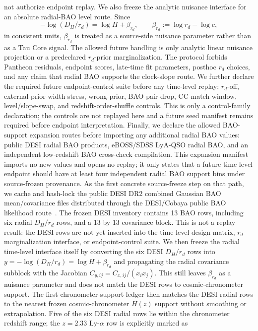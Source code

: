 \documentclass[11pt]{article}
\begin{document}
not authorize endpoint replay.
We also freeze the analytic nuisance interface for an absolute radial-BAO
level route.  Since
\[
  -\log(D_H/r_d)=\log H+\beta_{r_d},\qquad
  \beta_{r_d}:=\log r_d-\log c ,
\]
in consistent units, \(\beta_{r_d}\) is treated as a source-side nuisance
parameter rather than as a Tau Core signal.  The allowed future handling is
only analytic linear nuisance projection or a predeclared \(r_d\)-prior
marginalization.  The protocol forbids Pantheon residuals, endpoint scores,
late-time fit parameters, posthoc \(r_d\) choices, and any claim that radial
BAO supports the clock-slope route.
We further declare the required future endpoint-control suite before any
time-level replay: \(r_d\)-off, external-prior-width stress, wrong-prior,
BAO-pair-drop, CC-match-window, level/slope-swap, and redshift-order-shuffle
controls.  This is only a control-family declaration; the controls are not
replayed here and a future seed manifest remains required before endpoint
interpretation.
Finally, we declare the allowed BAO-support expansion routes before importing
any additional radial BAO values: public DESI radial BAO products,
eBOSS/SDSS LyA-QSO radial BAO, and an independent low-redshift BAO
cross-check compilation.  This expansion manifest imports no new values and
opens no replay; it only states that a future time-level endpoint should have
at least four independent radial BAO support bins under source-frozen
provenance.
As the first concrete source-freeze step on that path, we cache and hash-lock
the public DESI DR2 combined Gaussian BAO mean/covariance files distributed
through the DESI/Cobaya public BAO likelihood
route~\cite{DESIDR2BAO2025,DESIDR2Products2025}.  The frozen DESI inventory
contains 13 BAO rows, including six radial \(D_H/r_d\) rows, and a 13 by 13
covariance block.  This is not a replay result: the DESI rows are not yet
inserted into the time-level design matrix, \(r_d\)-marginalization interface,
or endpoint-control suite.
We then freeze the radial time-level interface itself by converting the six
DESI \(D_H/r_d\) rows into \(y=-\log(D_H/r_d)=\log H+\beta_{r_d}\) and
propagating the radial covariance subblock with the Jacobian
\(C_{y,ij}=C_{x,ij}/(x_i x_j)\).  This still leaves \(\beta_{r_d}\) as a
nuisance parameter and does not match the DESI rows to cosmic-chronometer
support.
The first chronometer-support ledger then matches the DESI radial rows to the
nearest frozen cosmic-chronometer \(H(z)\) support without smoothing or
extrapolation.  Five of the six DESI radial rows lie within the chronometer
redshift range; the \(z=2.33\) Ly-\(\alpha\) row is explicitly marked as
\end{document}
